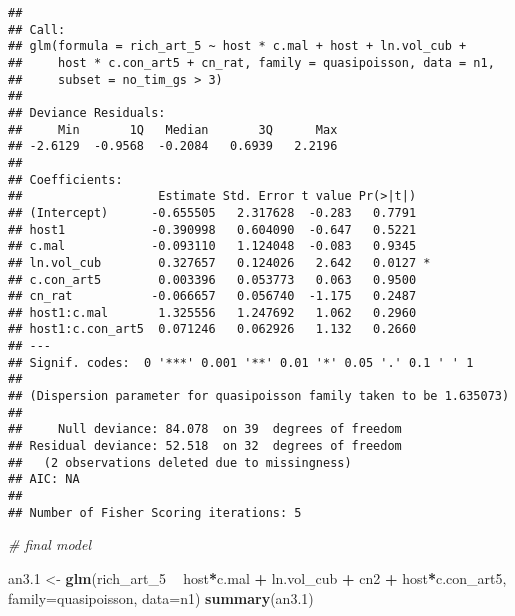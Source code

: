 \documentclass[]{article}
\newenvironment{Shaded}{\begin{snugshade}}{\end{snugshade}}
\newcommand{\KeywordTok}[1]{\textcolor[rgb]{0.13,0.29,0.53}{\textbf{#1}}}
\newcommand{\DataTypeTok}[1]{\textcolor[rgb]{0.13,0.29,0.53}{#1}}
\newcommand{\DecValTok}[1]{\textcolor[rgb]{0.00,0.00,0.81}{#1}}
\newcommand{\StringTok}[1]{\textcolor[rgb]{0.31,0.60,0.02}{#1}}
\newcommand{\CommentTok}[1]{\textcolor[rgb]{0.56,0.35,0.01}{\textit{#1}}}
\newcommand{\OperatorTok}[1]{\textcolor[rgb]{0.81,0.36,0.00}{\textbf{#1}}}
\newcommand{\NormalTok}[1]{#1}
\begin{document}
\begin{verbatim}
## 
## Call:
## glm(formula = rich_art_5 ~ host * c.mal + host + ln.vol_cub + 
##     host * c.con_art5 + cn_rat, family = quasipoisson, data = n1, 
##     subset = no_tim_gs > 3)
## 
## Deviance Residuals: 
##     Min       1Q   Median       3Q      Max  
## -2.6129  -0.9568  -0.2084   0.6939   2.2196  
## 
## Coefficients:
##                   Estimate Std. Error t value Pr(>|t|)  
## (Intercept)      -0.655505   2.317628  -0.283   0.7791  
## host1            -0.390998   0.604090  -0.647   0.5221  
## c.mal            -0.093110   1.124048  -0.083   0.9345  
## ln.vol_cub        0.327657   0.124026   2.642   0.0127 *
## c.con_art5        0.003396   0.053773   0.063   0.9500  
## cn_rat           -0.066657   0.056740  -1.175   0.2487  
## host1:c.mal       1.325556   1.247692   1.062   0.2960  
## host1:c.con_art5  0.071246   0.062926   1.132   0.2660  
## ---
## Signif. codes:  0 '***' 0.001 '**' 0.01 '*' 0.05 '.' 0.1 ' ' 1
## 
## (Dispersion parameter for quasipoisson family taken to be 1.635073)
## 
##     Null deviance: 84.078  on 39  degrees of freedom
## Residual deviance: 52.518  on 32  degrees of freedom
##   (2 observations deleted due to missingness)
## AIC: NA
## 
## Number of Fisher Scoring iterations: 5
\end{verbatim}

\begin{Shaded}
\begin{Highlighting}[]
\CommentTok{# final model}

\NormalTok{an3.}\DecValTok{1}\NormalTok{ <-}\StringTok{ }\KeywordTok{glm}\NormalTok{(rich_art_}\DecValTok{5} \OperatorTok{~}\StringTok{ }\NormalTok{host}\OperatorTok{*}\NormalTok{c.mal }\OperatorTok{+}\StringTok{ }\NormalTok{ln.vol_cub }\OperatorTok{+}\StringTok{ }\NormalTok{cn2 }\OperatorTok{+}\StringTok{ }\NormalTok{host}\OperatorTok{*}\NormalTok{c.con_art5, }
           \DataTypeTok{family=}\NormalTok{quasipoisson, }\DataTypeTok{data=}\NormalTok{n1)}
\KeywordTok{summary}\NormalTok{(an3.}\DecValTok{1}\NormalTok{)}
\end{Highlighting}
\end{Shaded}
\end{document}
